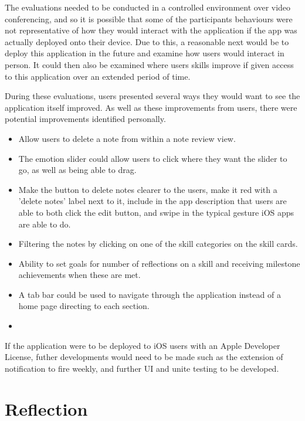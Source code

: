 \documentclass{l4proj}
\begin{document}
The evaluations needed to be conducted in a controlled environment over video conferencing, and so it is possible that some of the participants behaviours were not representative of how they would interact with the application if the app was actually deployed onto their device. Due to this, a reasonable next would be to deploy this application in the future and examine how users would interact in person. It could then also be examined where users skills improve if given access to this application over an extended period of time.

During these evaluations, users presented several ways they would want to see the application itself improved. As well as these improvements from users, there were potential improvements identified personally.

\begin{itemize}
    \item Allow users to delete a note from within a note review view.
    \item The emotion slider could allow users to click where they want the slider to go, as well as being able to drag.
    \item Make the button to delete notes clearer to the users, make it red with a 'delete notes' label next to it, include in the app description that users are able to both click the edit button, and swipe in the typical gesture iOS apps are able to do.
    \item Filtering the notes by clicking on one of the skill categories on the skill cards.
    \item Ability to set goals for number of reflections on a skill and receiving milestone achievements when these are met.
    \item A tab bar could be used to navigate through the application instead of a home page directing to each section.
    \item 
\end{itemize}

If the application were to be deployed to iOS users with an Apple Developer License, futher developments would need to be made such as the extension of notification to fire weekly, and further UI and unite testing to be developed. 


\section{Reflection}
\end{document}
